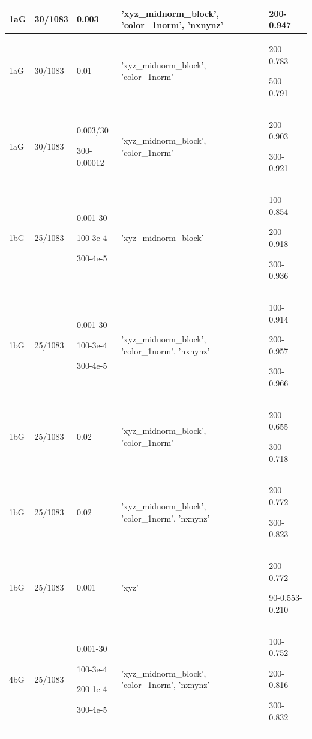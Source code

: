 \documentclass{article}
\begin{document}
\begin{center}
\begin{tabular}{|p{1cm} |p{1.5cm} | p{2cm} | p{3.5cm} || p{4cm}|}
		
		\hline\hline
		1aG & 30/1083 & 0.003 & 'xyz\_midnorm\_block', 'color\_1norm', 'nxnynz'& 200-0.947  \\  [0.5ex]
		\hline		
		1aG & 30/1083 & 0.01  & 'xyz\_midnorm\_block', 'color\_1norm'& 200-0.783 \par 500-0.791  \\  [0.5ex]
		\hline		
		1aG & 30/1083 & 0.003/30 \par 300-0.00012 & 'xyz\_midnorm\_block', 'color\_1norm'& 200-0.903 \par 300-0.921  \\  [0.5ex]
		\hline\hline
		
		1bG & 25/1083 & 0.001-30 \par 100-3e-4 \par 300-4e-5 & 'xyz\_midnorm\_block'& 100-0.854 \par 200-0.918 \par 300-0.936  \\  [0.5ex]
		\hline
		1bG & 25/1083 & 0.001-30 \par 100-3e-4 \par 300-4e-5 & 'xyz\_midnorm\_block', 'color\_1norm', 'nxnynz'& 100-0.914 \par 200-0.957 \par 300-0.966  \\  [0.5ex]
		\hline	
		1bG & 25/1083 & 0.02 & 'xyz\_midnorm\_block', 'color\_1norm'& 200-0.655 \par 300-0.718  \\  [0.5ex]
		\hline
		1bG & 25/1083 & 0.02 & 'xyz\_midnorm\_block', 'color\_1norm', 'nxnynz'& 200-0.772 \par 300-0.823  \\  [0.5ex]
		\hline
		1bG & 25/1083 & 0.001 & 'xyz'& 200-0.772 \par 90-0.553-0.210  \\  [0.5ex]
		\hline \hline
		
		4bG & 25/1083 & 0.001-30 \par 100-3e-4 \par 200-1e-4 \par 300-4e-5& 'xyz\_midnorm\_block', 'color\_1norm', 'nxnynz'& 100-0.752 \par 200-0.816 \par 300-0.832  \\  [0.5ex]
		

\end{tabular}
\end{center}
\end{document}
